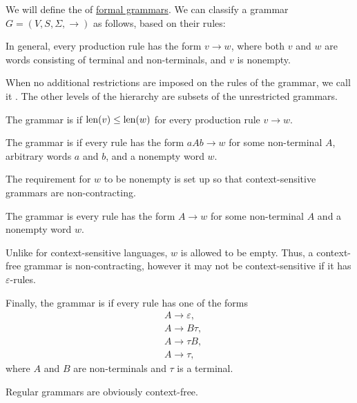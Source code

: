 \begin{definition}\label{def:chomsky_hierarchy}
  We will define the  of \hyperref[def:formal_grammar]{formal grammars}. We can classify a grammar \( G = (V, S, \Sigma, \to) \) as follows, based on their rules:
  \begin{thmenum}
     In general, every production rule has the form \( v \to w \), where both \( v \) and \( w \) are words consisting of terminal and non-terminals, and \( v \) is nonempty.

    When no additional restrictions are imposed on the rules of the grammar, we call it . The other levels of the hierarchy are subsets of the unrestricted grammars.

     The grammar is  if \( \operatorname{len}(v) \leq \operatorname{len}(w) \) for every production rule \( v \to w \).

     The grammar is  if every rule has the form \( aAb \to w \) for some non-terminal \( A \), arbitrary words \( a \) and \( b \), and a nonempty word \( w \).

    The requirement for \( w \) to be nonempty is set up so that context-sensitive grammars are non-contracting.

     The grammar is  every rule has the form \( A \to w \) for some non-terminal \( A \) and a nonempty word \( w \).

    Unlike for context-sensitive languages, \( w \) is allowed to be empty. Thus, a context-free grammar is non-contracting, however it may not be context-sensitive if it has \( \varepsilon \)-rules.

     Finally, the grammar is  if every rule has one of the forms
    \begin{align*}
      &A \to \varepsilon, \\
      &A \to B \tau, \\
      &A \to \tau B, \\
      &A \to \tau,
    \end{align*}
    where \( A \) and \( B \) are non-terminals and \( \tau \) is a terminal.

    Regular grammars are obviously context-free.
  \end{thmenum}
\end{definition}

